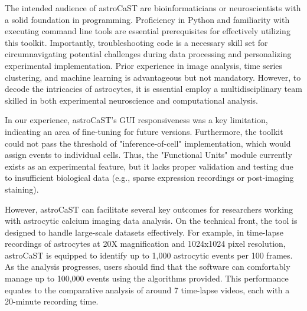 The intended audience of astroCaST are bioinformaticians or neuroscientists with a solid foundation in programming. Proficiency in Python and familiarity with executing command line tools are essential prerequisites for effectively utilizing this toolkit. Importantly, troubleshooting code is a necessary skill set for circumnavigating potential challenges during data processing and personalizing experimental implementation. Prior experience in image analysis, time series clustering, and machine learning is advantageous but not mandatory. However, to decode the intricacies of astrocytes, it is essential employ a multidisciplinary team skilled in both experimental neuroscience and computational analysis.

In our experience, astroCaST's \ac{GUI} responsiveness was a key limitation, indicating an area of fine-tuning for future versions. Furthermore, the toolkit could not pass the threshold of "inference-of-cell" implementation, which would assign events to individual cells. Thus, the "Functional Units" module currently exists as an experimental feature, but it lacks proper validation and testing due to insufficient biological data (e.g., sparse  expression recordings or post-imaging staining).

However, \ac{astroCaST} can facilitate several key outcomes for researchers working with astrocytic calcium imaging data analysis. On the technical front, the tool is designed to handle large-scale datasets effectively. For example, in time-lapse recordings of astrocytes at 20X magnification and 1024x1024 pixel resolution, astroCaST is equipped to identify up to 1,000 astrocytic events per 100 frames. As the analysis progresses, users should find that the software can comfortably manage up to 100,000 events using the algorithms provided. This performance equates to the comparative analysis of around 7 time-lapse videos, each with a 20-minute recording time. 


